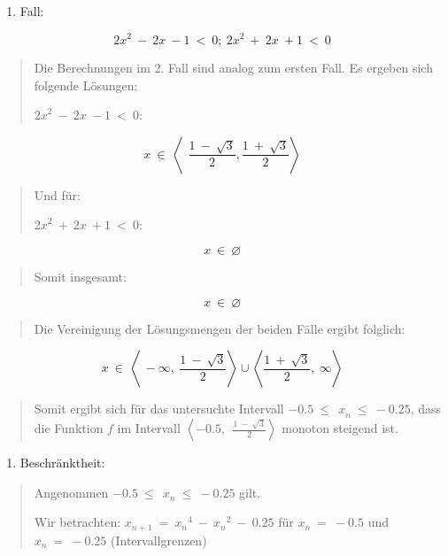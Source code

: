 \documentclass{book}
\begin{document}
\begin{longtable}[]
\begin{minipage}[b]{\linewidth}
\begin{enumerate}
\def\labelenumi{\arabic{enumi}.}
\setcounter{enumi}{1}
\item
  Fall:
\end{enumerate}

\[{2x}^{2}\  - \ 2x\  - 1\  < \ 0;\ {2x}^{2}\  + \ 2x\  + 1\  < \ 0\]

\begin{quote}
Die Berechnungen im 2. Fall sind analog zum ersten Fall. Es ergeben sich
folgende Lösungen:

\({2x}^{2}\  - \ 2x\  - 1\  < \ 0\):
\end{quote}

\[x\  \in \ \left\langle \ \ \frac{1\  - \ \sqrt{3}}{2},\frac{1\  + \ \sqrt{3}}{2} \right\rangle\]

\begin{quote}
Und für:

\({2x}^{2}\  + \ 2x\  + 1\  < \ 0\):
\end{quote}

\[x\  \in \ \varnothing\]

\begin{quote}
Somit insgesamt:
\end{quote}

\[x\  \in \ \varnothing\]

\begin{quote}
Die Vereinigung der Lösungsmengen der beiden Fälle ergibt folglich:
\end{quote}

\[x\  \in \ \left\langle \  - \infty,\ \frac{1\  - \ \sqrt{3}}{2} \right\rangle \cup \left\langle \frac{1\  + \ \sqrt{3}}{2},\ \infty \right\rangle\]

\begin{quote}
Somit ergibt sich für das untersuchte Intervall
\(- 0.5\ {\leq \ \ x}_{n}\  \leq \  - 0.25\), dass die Funktion \(f\) im
Intervall
\(\left\langle - 0.5,\ \ \frac{1\  - \ \sqrt{3}}{2} \right\rangle\)
monoton steigend ist.
\end{quote}

\begin{enumerate}
\def\labelenumi{\arabic{enumi})}
\setcounter{enumi}{1}
\item
  Beschränktheit:
\end{enumerate}

\begin{quote}
Angenommen \(- 0.5\ {\leq \ \ x}_{n}\  \leq \  - 0.25\) gilt.

Wir betrachten:
\(x_{n + 1}\  = \ {x_{n}}^{4}\  - \ {x_{n}}^{2}\  - \ 0.25\) für
\(x_{n}\  = \  - 0.5\) und \(x_{n}\  = \  - 0.25\) (Intervallgrenzen)


\end{quote}
\end{minipage}
\end{longtable}
\end{document}
